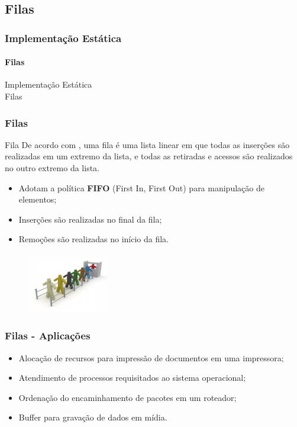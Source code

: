 \documentclass[aspectratio=169]{beamer}
\begin{document}
\subsection{Filas}

\begin{frame}
\frametitle{Implementação Estática}
\framesubtitle{Filas}
\centering
\huge{Implementação Estática\\
Filas
}
\end{frame}


\begin{frame}
\frametitle{Filas}
\begin{block}{Fila}
 De acordo com , uma fila é uma lista linear em que todas as inserções são realizadas em um extremo da lista, e todas as retiradas e acessos são realizados no outro extremo da lista.
\end{block}

\begin{itemize}
 \item Adotam a política {\bf FIFO} (First In, First Out) para manipulação de elementos;
 \item Inserções são realizadas no final da fila;
 \item Remoções são realizadas no início da fila.
\end{itemize}

\begin{figure}[!h]
  \centering
  \includegraphics[width=100pt]{imgs/fila.jpg}
  \label{fig_fila}
\end{figure}

\end{frame}


\begin{frame}
\frametitle{Filas - Aplicações}
\begin{itemize}
 \item Alocação de recursos para impressão de documentos em uma impressora;
 \item Atendimento de processos requisitados ao sistema operacional;
 \item Ordenação do encaminhamento de pacotes em um roteador;
 \item Buffer para gravação de dados em mídia.
\end{itemize}
\end{frame}
\end{document}

